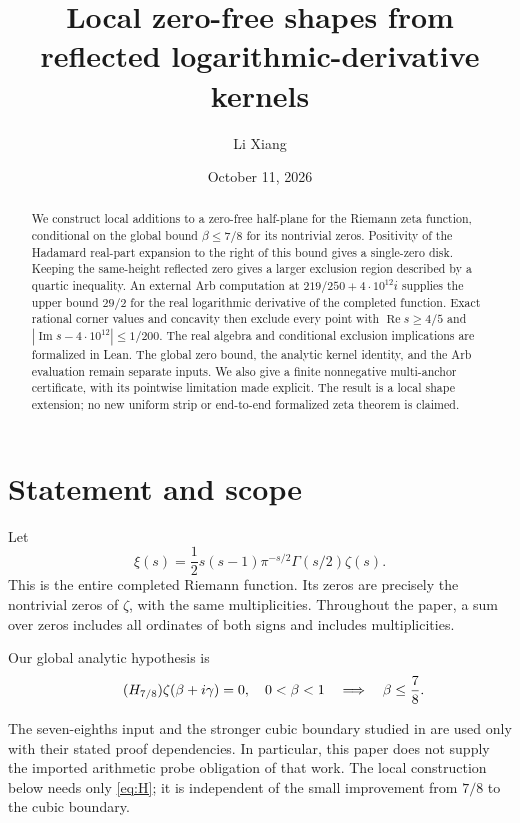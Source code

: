 \documentclass[11pt,a4paper]{article}
\title{Local zero-free shapes from reflected logarithmic-derivative kernels}
\author{Li Xiang}
\date{October 11, 2026}
\theoremstyle{definition}
\newcommand{\Rea}{\operatorname{Re}}
\newcommand{\Ima}{\operatorname{Im}}
\begin{document}
\maketitle

\begin{abstract}
We construct local additions to a zero-free half-plane for the Riemann
zeta function, conditional on the global bound $\beta\le 7/8$ for its
nontrivial zeros. Positivity of the Hadamard real-part expansion to the
right of this bound gives a single-zero disk. Keeping the same-height
reflected zero gives a larger exclusion region described by a quartic
inequality. An external Arb computation at
$219/250+4\cdot10^{12}i$ supplies the upper bound $29/2$ for the real
logarithmic derivative of the completed function. Exact rational corner
values and concavity then exclude every point with
$\Rea s\ge4/5$ and $|\Ima s-4\cdot10^{12}|\le1/200$.
The real algebra and conditional exclusion implications are formalized
in Lean. The global zero bound, the analytic kernel identity, and the
Arb evaluation remain separate inputs. We also give a finite nonnegative
multi-anchor certificate, with its pointwise limitation made explicit.
The result is a local shape extension; no new uniform strip or
end-to-end formalized zeta theorem is claimed.
\end{abstract}

\section{Statement and scope}
\label{sec:scope}

Let
\begin{equation}\label{eq:xi}
 \xi(s)=\frac12 s(s-1)\pi^{-s/2}\Gamma(s/2)\zeta(s).
\end{equation}
This is the entire completed Riemann function. Its zeros are precisely
the nontrivial zeros of $\zeta$, with the same multiplicities. Throughout
the paper, a sum over zeros includes all ordinates of both signs and
includes multiplicities.

Our global analytic hypothesis is
\begin{equation}\tag{$H_{7/8}$}\label{eq:H}
 \zeta(\beta+i\gamma)=0,\quad 0<\beta<1
 \quad\Longrightarrow\quad \beta\le\frac78.
\end{equation}
\addtocounter{equation}{1}
The seven-eighths input and the stronger cubic boundary studied in
\cite{Cubic} are used only with their stated proof dependencies. In
particular, this paper does not supply the imported arithmetic probe
obligation of that work. The local construction below needs only
\eqref{eq:H}; it is independent of the small improvement from $7/8$ to
the cubic boundary.
\end{document}

